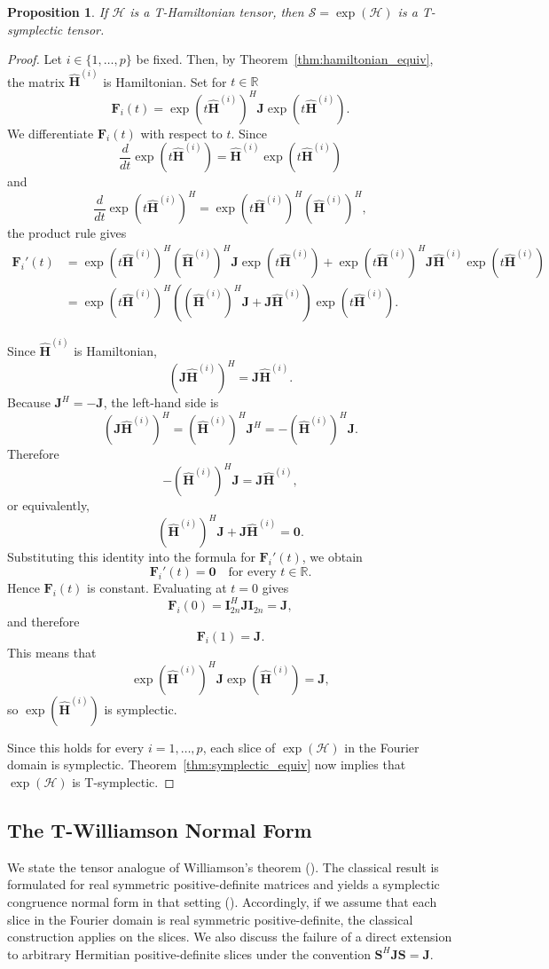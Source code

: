 \documentclass[pdflatex,sn-mathphys-ay]{sn-jnl}
\newcommand{\T}[1]{\mathcal{#1}}    %
\newcommand{\M}[1]{\bm{#1}}     %
\newcommand{\R}{\mathbb{R}}         %
\theoremstyle{thmstyleone}
\newtheorem{proposition}[theorem]{Proposition}
\theoremstyle{thmstyletwo}
\theoremstyle{thmstylethree}
\numberwithin{equation}{section}
\begin{document}
\begin{proposition}
\label{prop:exponential_map}
If $\T{H}$ is a T-Hamiltonian tensor, then $\T{S} = \exp(\T{H})$ is a T-symplectic tensor.
\end{proposition}
\begin{proof}
Let $i \in \{1,\dots,p\}$ be fixed. Then, by Theorem~\ref{thm:hamiltonian_equiv}, the matrix $\widehat{\M{H}}^{(i)}$ is Hamiltonian. Set for $t\in\mathbb{R}$
$$
\M{F}_i(t) = \exp(t\widehat{\M{H}}^{(i)})^H \M{J}\exp(t\widehat{\M{H}}^{(i)}).
$$
We differentiate $\M{F}_i(t)$ with respect to $t$. Since
$$
\frac{d}{dt}\exp(t\widehat{\M{H}}^{(i)}) = \widehat{\M{H}}^{(i)}\exp(t\widehat{\M{H}}^{(i)})
$$
and
$$
\frac{d}{dt}\exp(t\widehat{\M{H}}^{(i)})^H
=
\exp(t\widehat{\M{H}}^{(i)})^H(\widehat{\M{H}}^{(i)})^H,
$$
the product rule gives
\begin{align*}
\M{F}_i'(t)
&=
\exp(t\widehat{\M{H}}^{(i)})^H(\widehat{\M{H}}^{(i)})^H \M{J}\exp(t\widehat{\M{H}}^{(i)}) +
\exp(t\widehat{\M{H}}^{(i)})^H \M{J}\widehat{\M{H}}^{(i)}\exp(t\widehat{\M{H}}^{(i)}) \\
&=
\exp(t\widehat{\M{H}}^{(i)})^H
\left(
(\widehat{\M{H}}^{(i)})^H \M{J} + \M{J}\widehat{\M{H}}^{(i)}
\right)
\exp(t\widehat{\M{H}}^{(i)}).
\end{align*}

Since $\widehat{\M{H}}^{(i)}$ is Hamiltonian,
$$
(\M{J}\widehat{\M{H}}^{(i)})^H = \M{J}\widehat{\M{H}}^{(i)}.
$$
Because $\M{J}^H = -\M{J}$, the left-hand side is
$$
(\M{J}\widehat{\M{H}}^{(i)})^H
=
(\widehat{\M{H}}^{(i)})^H \M{J}^H
=
-(\widehat{\M{H}}^{(i)})^H \M{J}.
$$
Therefore
$$
-(\widehat{\M{H}}^{(i)})^H \M{J} = \M{J}\widehat{\M{H}}^{(i)},
$$
or equivalently,
$$
(\widehat{\M{H}}^{(i)})^H \M{J} + \M{J}\widehat{\M{H}}^{(i)} = \M{0}.
$$
Substituting this identity into the formula for $\M{F}_i'(t)$, we obtain
$$
\M{F}_i'(t) = \M{0}
\quad \text{for every } t \in \R.
$$
Hence $\M{F}_i(t)$ is constant. Evaluating at $t=0$ gives
$$
\M{F}_i(0) = \M{I}_{2n}^H \M{J}\M{I}_{2n} = \M{J},
$$
and therefore 
$$
\M{F}_i(1) = \M{J}.
$$
This means that
$$
\exp(\widehat{\M{H}}^{(i)})^H \M{J}\exp(\widehat{\M{H}}^{(i)}) = \M{J},
$$
so $\exp(\widehat{\M{H}}^{(i)})$ is symplectic.

Since this holds for every $i=1,\dots,p$, each slice of $\exp(\T{H})$ in the Fourier domain is symplectic. Theorem~\ref{thm:symplectic_equiv} now implies that $\exp(\T{H})$ is T-symplectic.
\end{proof}

\subsection{The T-Williamson Normal Form}
We state the tensor analogue of Williamson's theorem (\cite{williamson1936algebraic}). The classical result is formulated for real symmetric positive-definite matrices and yields a symplectic congruence normal form in that setting  (\cite{weedbrook2012gaussian,nicacio2021williamson}). 
Accordingly, if we assume that each slice in the Fourier domain is real symmetric positive-definite, the classical construction applies on the slices.
We also discuss the failure of a direct extension to arbitrary Hermitian positive-definite slices under the convention $\M{S}^H \M{J}\M{S} = \M{J}$. 
\end{document}
